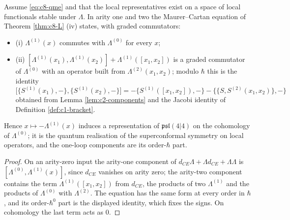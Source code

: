 \begin{corollary}
\label{cor:c8-homotopy}
Assume \eqref{eq:c8-qme} and that the local representatives exist on a space of local functionals stable under $\Lambda$. In arity one and two the Maurer--Cartan equation of Theorem \ref{thm:c8-L} (iv) states, with graded commutators:
\begin{itemize}
\item (i) $\Lambda^{(1)}(x)$ commutes with $\Lambda^{(0)}$ for every $x$;
\item (ii) $[\Lambda^{(1)}(x_1),\Lambda^{(1)}(x_2)]+\Lambda^{(1)}([x_1,x_2])$ is a graded commutator of $\Lambda^{(0)}$ with an operator built from $\Lambda^{(2)}(x_1,x_2)$; modulo $\hbar$ this is the identity
\[
\big[\{S^{(1)}(x_1),-\},\{S^{(1)}(x_2),-\}\big]=-\{S^{(1)}([x_1,x_2]),-\}-\big\{\{S,S^{(2)}(x_1,x_2)\},-\big\}
\]
obtained from Lemma \ref{lem:c2-components} and the Jacobi identity of Definition \ref{def:c1-bracket}.
\end{itemize}
Hence $x\mapsto-\Lambda^{(1)}(x)$ induces a representation of $\mathfrak{psl}(4|4)$ on the cohomology of $\Lambda^{(0)}$; it is the quantum realisation of the superconformal symmetry on local operators, and the one-loop components are its order-$\hbar$ part.
\end{corollary}

\begin{proof}
On an arity-zero input the arity-one component of $d_{CE}\Lambda+\Lambda d_{CE}+\Lambda\Lambda$ is $[\Lambda^{(0)},\Lambda^{(1)}(x)]$, since $d_{CE}$ vanishes on arity zero; the arity-two component contains the term $\Lambda^{(1)}([x_1,x_2])$ from $d_{CE}$, the products of two $\Lambda^{(1)}$ and the products of $\Lambda^{(0)}$ with $\Lambda^{(2)}$. The equation has the same form at every order in $\hbar$, and its order-$\hbar^0$ part is the displayed identity, which fixes the signs. On cohomology the last term acts as $0$.
\end{proof}

